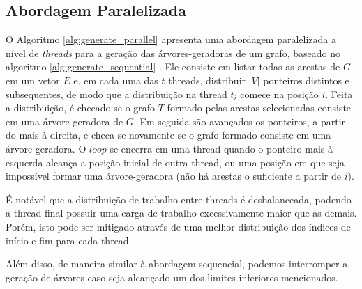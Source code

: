 \documentclass[article,a4paper,12pt,brazil,sumario=tradicional]{abntex2}
\theoremstyle{definition} %
\begin{document}
\subsection{Abordagem Paralelizada}
\label{abordagem-paralelizada}

O Algoritmo \ref{alg:generate_parallel} apresenta uma abordagem paralelizada a nível de \textit{threads} para a geração das árvores-geradoras de um grafo, baseado no algoritmo \ref{alg:generate_sequential} \cite{COUTO2022106265}. Ele consiste em listar todas as arestas de $G$ em um vetor $E$ e, em cada uma das $t$ threads, distribuir $|V|$ ponteiros distintos e subsequentes, de modo que a distribuição na thread $t_i$ comece na posição $i$. Feita a distribuição, é checado se o grafo $T$ formado pelas arestas selecionadas consiste em uma árvore-geradora de $G$. Em seguida são avançados os ponteiros, a partir do mais à direita, e checa-se novamente se o grafo formado consiste em uma árvore-geradora. O $loop$ se encerra em uma thread quando o ponteiro mais à esquerda alcança a posição inicial de outra thread, ou uma posição em que seja impossível formar uma árvore-geradora (não há arestas o suficiente a partir de $i$).

É notável que a distribuição de trabalho entre threads é desbalanceada, podendo a thread final possuir uma carga de trabalho excessivamente maior que as demais. Porém, isto pode ser mitigado através de uma melhor distribuição dos índices de início e fim para cada thread.

Além disso, de maneira similar à abordagem sequencial, podemos interromper a geração de árvores caso seja alcançado um dos limites-inferiores mencionados.




\end{document}
